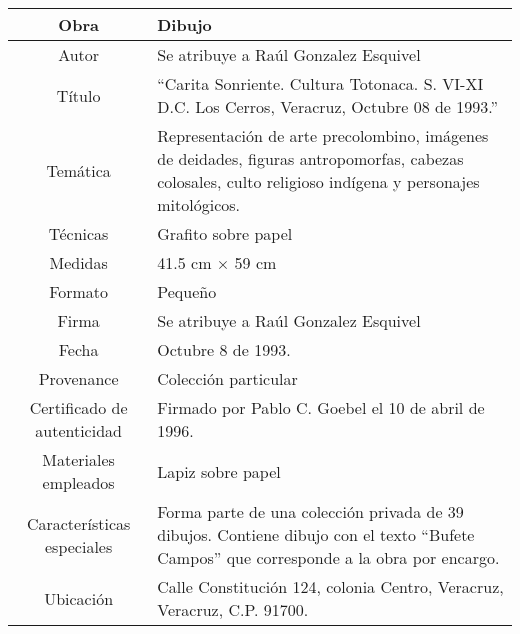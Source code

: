 \begin{table}[H]
\centering
\begin{tabular}{|c|m{}|}
\hline
Obra& Dibujo	\\
\hline
Autor & Se atribuye a Ra\'ul Gonzalez Esquivel\\
\hline
T\'itulo & ``Carita Sonriente. Cultura Totonaca. S. VI-XI D.C. Los Cerros, Veracruz, Octubre 08 de 1993.'' \\
\hline
Tem\'atica & Representaci\'on de arte precolombino, im\'agenes de deidades, figuras antropomorfas, cabezas colosales, culto religioso ind\'igena y personajes mitol\'ogicos.\\
\hline
T\'ecnicas &Grafito sobre papel \\
\hline
Medidas & 41.5 cm $\times$ 59 cm \\
\hline
 Formato & Peque\~no \\
 \hline
 Firma & Se atribuye a Ra\'ul Gonzalez Esquivel\\ 
 \hline
  Fecha & Octubre 8 de 1993.\\
 \hline
 Provenance & Colecci\'on particular\\
 \hline
 Certificado de autenticidad& Firmado por Pablo C. Goebel el 10 de abril de 1996.  \\
 \hline 
  Materiales empleados & Lapiz sobre papel\\
 \hline
 Caracter\'isticas especiales & Forma parte de una colecci\'on privada de 39 dibujos. 
Contiene dibujo con el texto ``Bufete Campos'' que corresponde a la obra por encargo. \\
\hline 
Ubicaci\'on & Calle Constituci\'on 124, colonia Centro, Veracruz, Veracruz, C.P. 91700.\\
\hline

\end{tabular}
\end{table}

